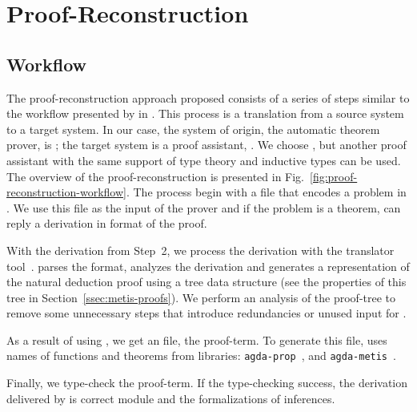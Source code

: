 \documentclass[../main.tex]{subfiles}
\begin{document}

\section{Proof-Reconstruction}
\label{sec:proof-reconstruction}

\subsection{Workflow}
\label{ssec:workflow}



The proof-reconstruction approach proposed consists of a series
of steps similar to the workflow presented by \citeauthor{sultana2015} in
\cite{sultana2015}. This process is a translation from a source
system to a target system. In our case, the system of origin, the
automatic theorem prover, is \Metis; the target system is a proof
assistant, \Agda. We choose \Agda, but another proof assistant with the
same support of type theory and inductive types can be used.
The overview of the proof-reconstruction is presented in
Fig.~\ref{fig:proof-reconstruction-workflow}. The process begin with
a \TPTP file that encodes a problem in \CPL. We use this file as the
input of the \Metis prover and if the problem is a theorem, \Metis can
reply a derivation in \TSTP format of the proof.

With the \TSTP derivation from Step~2, we process the derivation with the
\Athena translator tool~\cite{Athena}.
\Athena parses the \TSTP format, analyzes the
derivation and generates a representation of the natural deduction
proof using a tree data structure (see the properties
of this tree in Section~\ref{ssec:metis-proofs}).
We perform an analysis of the proof-tree to remove some
unnecessary steps that introduce redundancies or unused input for
\Athena.

As a result of using \Athena, we get an \Agda file, the proof-term. To
generate this file, \Athena uses names of functions and theorems from
\Agda libraries:
\texttt{agda-prop}~\cite{AgdaProp}, and \texttt{agda-metis}~\cite{AgdaMetis}.

Finally, we type-check the \Agda proof-term. If the type-checking
success, the \TSTP derivation delivered by \Metis is correct
module \Agda and the formalizations of \Metis inferences.
\end{document}
